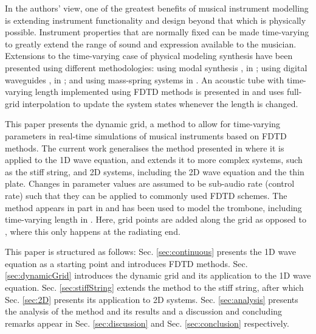 \documentclass[fleqn]{jaes}
\begin{document}
In the authors' view, one of the greatest  benefits of musical instrument modelling is extending instrument functionality and design beyond that which is physically possible. Instrument properties that are normally fixed can be made time-varying to greatly extend the range of sound and expression available to the musician. Extensions to the time-varying case of physical modeling synthesis have been presented using different methodologies: using modal synthesis \cite{morrison1993mosaic}, in \cite{Mehes2016, Willemsen2017}; using digital waveguides \cite{Smith1992}, in \cite{Michon2014, serafin2005virtual}; and using mass-spring systems in \cite{leonard2013virtual}. An acoustic tube with time-varying length implemented using FDTD methods is presented in \cite{Hofmann2019} and uses full-grid interpolation to update the system states whenever the length is changed.

This paper presents the dynamic grid, a method to allow for time-varying parameters in real-time simulations of musical instruments based on FDTD methods. The current work generalises the method presented in \cite{Willemsen2021a} where it is applied to the 1D wave equation, and extends it to more complex systems, such as the stiff string, and 2D systems, including the 2D wave equation and the thin plate. Changes in parameter values are assumed to be sub-audio rate (control rate) such that they can be applied to commonly used FDTD schemes.
The method appears in part in \cite[Ch. 12]{Willemsen2021Thesis} and has been used to model the trombone, including time-varying length in \cite{Willemsen2021b}. Here, grid points are added along the grid as opposed to \cite{Hofmann2019}, where this only happens at the radiating end. 

This paper is structured as follows: Sec. \ref{sec:continuous} presents the 1D wave equation as a starting point and introduces FDTD methods. Sec. \ref{sec:dynamicGrid} introduces the dynamic grid and its application to the 1D wave equation. Sec. \ref{sec:stiffString} extends the method to the stiff string, after which Sec. \ref{sec:2D} presents its application to 2D systems. Sec. \ref{sec:analysis} presents the analysis of the method and its results and a discussion and concluding remarks appear in Sec. \ref{sec:discussion} and Sec. \ref{sec:conclusion} respectively.
\end{document}
